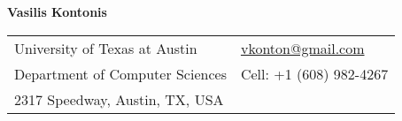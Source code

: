 \documentclass[letterpaper,11pt,oneside]{article}
\begin{document}

\noindent  \LARGE{\textbf{Vasilis Kontonis}}  \\
\vspace{-2ex}
\normalsize


\begin{center}
\begin{tabular}{l l}
 University of Texas at Austin& \hspace{1in} \href{mailto:vkonton@gmail.com}{vkonton@gmail.com} \\
 Department of Computer Sciences & \hspace{1in}  Cell: +1 (608) 982-4267\\ 
 2317 Speedway, Austin, TX, USA & \hspace{1in} \\
\end{tabular}
\end{center}

\vspace{1em}

\end{document}
